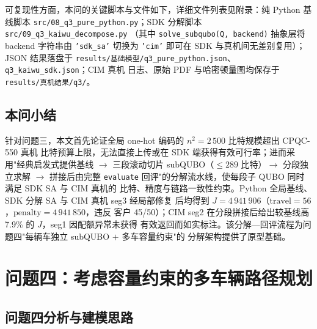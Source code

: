 \documentclass[UTF8,12pt,a4paper]{ctexart}
\begin{document}
可复现性方面，本问的关键脚本与文件如下，详细文件列表见附录：纯 Python 基线脚本
\texttt{src/08\_q3\_pure\_python.py}；SDK 分解脚本 \texttt{src/09\_q3\_kaiwu\_decompose.py}
（其中 \texttt{solve\_subqubo(Q, backend)} 抽象层将 backend 字符串由 \texttt{'sdk\_sa'}
切换为 \texttt{'cim'} 即可在 SDK 与真机间无差别复用）；JSON 结果落盘于
\texttt{results/基础模型/q3\_pure\_python.json}、\texttt{q3\_kaiwu\_sdk.json}；CIM 真机
日志、原始 PDF 与哈密顿量图均保存于 \texttt{results/真机结果/q3/}。

\subsection{本问小结}

针对问题三，本文首先论证全局 one-hot 编码的 $n^{2}=2\,500$ 比特规模超出 CPQC-550 真机
比特预算上限，无法直接上传或在 SDK 端获得有效可行率；进而采用"经典启发式提供基线
$\to$ 三段滚动切片 subQUBO（$\le 289$ 比特）$\to$ 分段独立求解 $\to$ 拼接后由完整
\texttt{evaluate} 回评"的分解流水线，使每段子 QUBO 同时满足 SDK SA 与 CIM 真机的
比特、精度与链路一致性约束。Python 全局基线、SDK 分解 SA 与 CIM 真机 seg3 经局部修复
后均得到 $J=4\,941\,906$（$\mathrm{travel}=56$，$\mathrm{penalty}=4\,941\,850$，违反
客户 45/50）；CIM seg2 在分段拼接后给出较基线高 7.9\% 的 $J$，seg1 因配额异常未获得
有效返回而如实标注。该分解—回评流程为问题四"每辆车独立 subQUBO $+$ 多车容量约束"的
分解架构提供了原型基础。

\setcounter{section}{8}

\section{问题四：考虑容量约束的多车辆路径规划}
\label{sec:q4}

\subsection{问题四分析与建模思路}
\label{subsec:q4-analysis}
\end{document}
